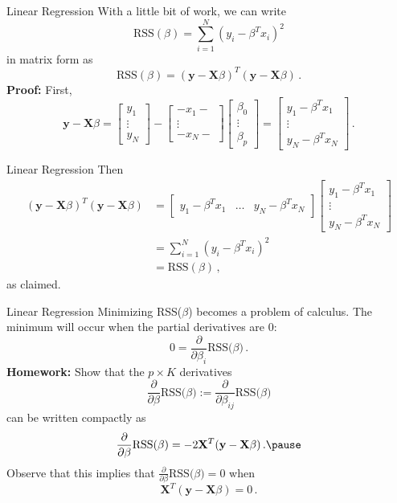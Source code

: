 \documentclass[10pt, handout]{beamer}
\begin{document}
\begin{frame}[fragile]{Linear Regression}
With a little bit of work, we can write
$$
\text{RSS}(\beta) = \sum_{i=1}^N(y_i - \beta^T x_i)^2
$$
in matrix form as
$$
\text{RSS}(\beta) = (\mathbf{y} - \mathbf{X}\beta)^T(\mathbf{y} - \mathbf{X}\beta)\,.
$$
\textbf{Proof:} First,  
$$
\mathbf{y} - \mathbf{X}\beta 
= 
\left[\begin{matrix}
y_1\\
\vdots\\
y_N
\end{matrix}\right]
-
\left[\begin{matrix}
-x_1-\\
\vdots\\
-x_N-
\end{matrix}\right]
\left[\begin{matrix}
\beta_0\\
\vdots\\
\beta_p
\end{matrix}\right]
=
\left[\begin{matrix}
y_1 - \beta^Tx_1\\
\vdots\\
y_N - \beta^Tx_N
\end{matrix}\right]\,.
$$
\end{frame}

\begin{frame}[fragile]{Linear Regression}
Then 
\begin{align*}
(\mathbf{y} - \mathbf{X}\beta)^T(\mathbf{y} - \mathbf{X}\beta) &= 
\left[\begin{matrix}
y_1 - \beta^Tx_1&
\ldots &
y_N - \beta^Tx_N
\end{matrix}\right]
\left[\begin{matrix}
y_1 - \beta^Tx_1\\
\vdots\\
y_N - \beta^Tx_N
\end{matrix}\right]
\\
&=
 \sum_{i=1}^N(y_i - \beta^T x_i)^2
\\
&=\text{RSS}(\beta) \,,
\end{align*}
as claimed.
\end{frame}




\begin{frame}[fragile]{Linear Regression}
Minimizing RSS($\beta$) becomes a problem of calculus. The minimum will occur when the partial derivatives are 0:
$$
0 = \frac{\partial}{\partial \beta_i} \text{RSS($\beta$)}\,.
$$
\pause
\textbf{Homework:} Show that the $p\times K$ derivatives 
$$
\frac{\partial}{\partial \beta} \text{RSS($\beta$)} := \frac{\partial}{\partial \beta_{ij}} \text{RSS($\beta$)}
$$
can be written compactly as
$$
\frac{\partial}{\partial \beta} \text{RSS($\beta$)} = -2\mathbf{X}^T(\mathbf{y} - \mathbf{X}\beta) \,.\pause
$$
Observe that this implies that $\frac{\partial}{\partial \beta} \text{RSS($\beta$)}  = 0$ when 
$$
\mathbf{X}^T(\mathbf{y} - \mathbf{X}\beta) = 0\,.
$$

\end{frame}
\end{document}
